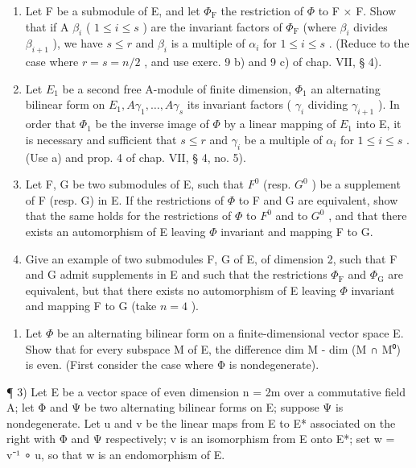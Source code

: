 \begin{enumerate}
\def\labelenumi{\alph{enumi})}
\item
  Let F be a submodule of E, and let \(\Phi_{\mathrm{F}}\) the restriction of \(\Phi\) to F × F. Show that if A \(\beta_{i}\) ( \(1 \leqslant i \leqslant s\) ) are the invariant factors of \(\Phi_{\mathrm{F}}\) (where \(\beta_{i}\) divides \(\beta_{i+1}\) ), we have \(s \leqslant r\) and \(\beta_{i}\) is a multiple of \(\alpha_{i}\) for \(1 \leqslant i \leqslant s\) . (Reduce to the case where \(r = s = n/2\) , and use exerc. 9 b) and 9 c) of chap. VII, § 4).
\item
  Let \(E_{1}\) be a second free A-module of finite dimension, \(\Phi_{1}\) an alternating bilinear form on \(E_{1}, A\gamma_{1}, \ldots, A\gamma_{s}\) its invariant factors ( \(\gamma_{i}\) dividing \(\gamma_{i+1}\) ). In order that \(\Phi_{1}\) be the inverse image of \(\Phi\) by a linear mapping of \(E_{1}\) into E, it is necessary and sufficient that \(s \leqslant r\) and \(\gamma_{i}\) be a multiple of \(\alpha_{i}\) for \(1 \leqslant i \leqslant s\) . (Use a) and prop. 4 of chap. VII, § 4, no. 5).
\item
  Let F, G be two submodules of E, such that \(F^{0}\) (resp. \(G^{0}\) ) be a supplement of F (resp. G) in E. If the restrictions of \(\Phi\) to F and G are equivalent, show that the same holds for the restrictions of \(\Phi\) to \(F^{0}\) and to \(G^{0}\) , and that there exists an automorphism of E leaving \(\Phi\) invariant and mapping F to G.
\item
  Give an example of two submodules F, G of E, of dimension 2, such that F and G admit supplements in E and such that the restrictions \(\Phi_{\mathrm{F}}\) and \(\Phi_{\mathrm{G}}\) are equivalent, but that there exists no automorphism of E leaving \(\Phi\) invariant and mapping F to G (take \(n = 4\) ).
\end{enumerate}

\begin{enumerate}
\def\labelenumi{\arabic{enumi})}
\setcounter{enumi}{1}
\tightlist
\item
  Let \(\Phi\) be an alternating bilinear form on a finite-dimensional vector space E. Show that for every subspace M of E, the difference dim M - dim (M ∩ M⁰) is even. (First consider the case where Φ is nondegenerate).
\end{enumerate}

¶ 3) Let E be a vector space of even dimension n = 2m over a commutative field A; let Φ and Ψ be two alternating bilinear forms on E; suppose Ψ is nondegenerate. Let u and v be the linear maps from E to E* associated on the right with Φ and Ψ respectively; v is an isomorphism from E onto E*; set w = v⁻¹ ∘ u, so that w is an endomorphism of E.

